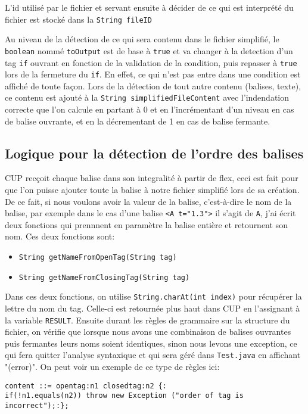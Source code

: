 \documentclass[a4paper]{article}
\begin{document}
L'id utilisé par le fichier et servant ensuite à décider de ce qui est interprété du fichier est stocké dans la \verb+String fileID+

Au niveau de la détection de ce qui sera contenu dans le fichier simplifié, le \verb+boolean+ nommé \verb+toOutput+ est de base à \verb+true+ et va changer à la detection d'un tag \verb+if+ ouvrant en fonction de la validation de la condition, puis repasser à \verb+true+ lors de la fermeture du \verb+if+. En effet, ce qui n'est pas entre dans une condition est affiché de toute façon. Lors de la détection de tout autre contenu (balises, texte), ce contenu est ajouté à la \verb+String simplifiedFileContent+ avec l'indendation correcte que l'on calcule en partant à 0 et en l'incrémentant d'un niveau en cas de balise ouvrante, et en la décrementant de 1 en cas de balise fermante.
\subsection{Logique pour la détection de l'ordre des balises}
CUP recçoit chaque balise dans son integralité à partir de flex, ceci est fait pour que l'on puisse ajouter toute la balise à notre fichier simplifié lors de sa création. De ce fait, si nous voulons avoir la valeur de la balise, c'est-à-dire le nom de la balise, par exemple dans le cas d'une balise \verb+<A t="1.3">+ il s'agit de \verb+A+, j'ai écrit deux fonctions qui prennnent en paramètre la balise entière et retournent son nom. Ces deux fonctions sont: \\
\begin{itemize}
	\item \verb+String getNameFromOpenTag(String tag)+
	\item \verb+String getNameFromClosingTag(String tag)+ \\
\end{itemize}
Dans ces deux fonctions, on utilise \verb+String.charAt(int index)+ pour récupérer la lettre du nom du tag. Celle-ci est retournée plus haut dans CUP en l'assignant à la variable \verb+RESULT+. Ensuite durant les règles de grammaire sur la structure du fichier, on vérifie que lorsque nous avons une combinaison de balises ouvrantes puis fermantes leurs noms soient identiques, sinon nous levons une exception, ce qui fera quitter l'analyse syntaxique et qui sera géré dans \verb+Test.java+ en affichant "(error)". On peut voir un exemple de ce type de règles ici:
\begin{verbatim}
content ::= opentag:n1 closedtag:n2 {:
if(!n1.equals(n2)) throw new Exception ("order of tag is incorrect");:};
\end{verbatim}
\end{document}
